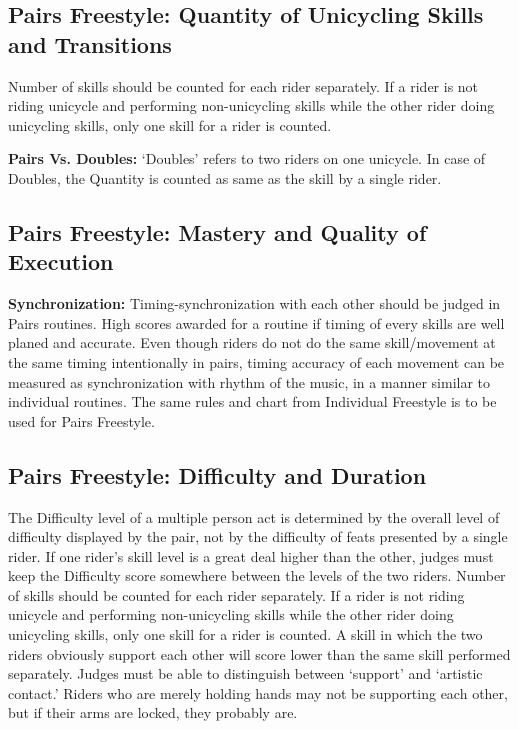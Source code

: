 \subsection{Pairs Freestyle: Quantity of Unicycling Skills and Transitions \label{subsec:freestyle_pairs-additional-judging-criteria_quantity}}
Number of skills should be counted for each rider separately.
If a rider is not riding unicycle and performing non-unicycling skills while the other rider doing unicycling skills, only one skill for a rider is counted.

\textbf{Pairs Vs. Doubles:} `Doubles' refers to two riders on one unicycle.
In case of Doubles, the Quantity is counted as same as the skill by a single rider.

\subsection{Pairs Freestyle: Mastery and Quality of Execution}
\textbf{Synchronization:} Timing-synchronization with each other should be judged in Pairs routines.
High scores awarded for a routine if timing of every skills are well planed and accurate.
Even though riders do not do the same skill/movement at the same timing intentionally in pairs, timing accuracy of each movement can be measured as synchronization with rhythm of the music, in a manner similar to individual routines.
The same rules and chart from Individual Freestyle is to be used for Pairs Freestyle.

\subsection{Pairs Freestyle: Difficulty and Duration \label{subsec:freestyle_pairs-additional-judging-criteria_difficulty-duration}}
The Difficulty level of a multiple person act is determined by the overall level of difficulty displayed by the pair, not by the difficulty of feats presented by a single rider.
If one rider's skill level is a great deal higher than the other, judges must keep the Difficulty score somewhere between the levels of the two riders.
Number of skills should be counted for each rider separately.
If a rider is not riding unicycle and performing non-unicycling skills while the other rider doing unicycling skills, only one skill for a rider is counted.
A skill in which the two riders obviously support each other will score lower than the same skill performed separately.
Judges must be able to distinguish between `support' and `artistic contact.' Riders who are merely holding hands may not be supporting each other, but if their arms are locked, they probably are.

